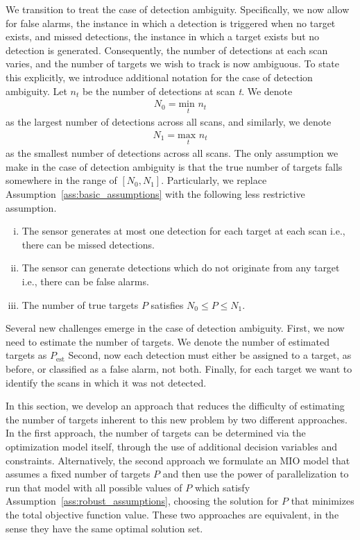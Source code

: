We transition to treat the case of detection ambiguity. Specifically, we now allow for false alarms, the instance in which a detection is triggered when no target exists, and missed detections, the instance in which a target exists but no detection is generated. Consequently, the number of detections at each scan varies, and the number of targets we wish to track is now ambiguous. To state this explicitly, we introduce additional notation for the case of detection ambiguity. Let $n_{t}$ be the number of detections at scan \textit{t}. We denote 
\begin{align*}
N_{0} = \underset{t}{\text{min }} n_{t}
\end{align*}
as the largest number of detections across all scans, and similarly, we denote
\begin{align*}
N_{1} = \underset{t}{\text{max }}  n_{t}
\end{align*}
as the smallest number of detections across all scans. The only assumption we make in the case of detection ambiguity is that the true number of targets falls somewhere in the range of $[N_{0},N_{1}]$. Particularly, we replace Assumption~\ref{ass:basic_assumptions} with the following less restrictive assumption.
\begin{assumption}\label{ass:robust_assumptions}
\leavevmode
\begin{enumerate}[(i)]
\item The sensor generates at most one detection for each target
 at each scan i.e., there can be missed detections.
\item The sensor can generate detections which do not originate from any target
i.e., there can be false alarms.
\item The number of true targets $P$ satisfies $N_0\leq P \leq N_1$.
\end{enumerate}
\end{assumption}

Several new challenges emerge in the case of detection ambiguity. First, we now need to estimate the number of targets. We denote the number of estimated targets as $P_{\text{est}}$ Second, now each detection must either be assigned to a target, as before, or classified as a false alarm, not both. Finally, for each target we want to identify the scans in which it was not detected. 

In this section, we develop an approach that reduces the difficulty of estimating the number of targets inherent to this new problem by two different approaches.  In the first approach, the number of targets can be determined via the optimization model itself, through the use of additional decision variables and constraints. 
Alternatively, the second approach  we formulate an MIO model that assumes a fixed number of targets $P$ and then use the power of parallelization to run that model with all possible values of $P$ which satisfy Assumption~\ref{ass:robust_assumptions}, choosing the solution for $P$ that minimizes the total objective function value. These two approaches are equivalent, in the sense they have the same optimal solution set.  

